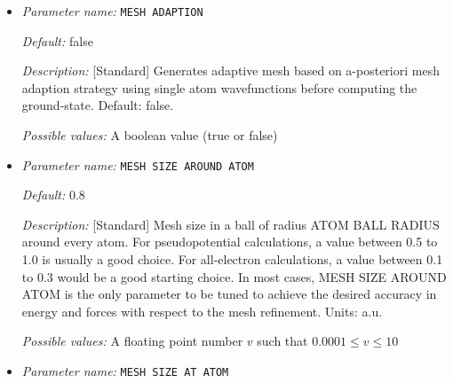 \begin{itemize}
{\it Default:} 5


{\it Description:} [Developer] Number of wavefunctions to be used for error estimation.


{\it Possible values:} An integer $n$ such that $0\leq n \leq 2147483647$
\item {\it Parameter name:} {\tt MESH ADAPTION}
\label{parameters:Finite element mesh parameters/Auto mesh generation parameters/MESH ADAPTION}
\label{parameters:Finite_20element_20mesh_20parameters/Auto_20mesh_20generation_20parameters/MESH_20ADAPTION}




{\it Default:} false


{\it Description:} [Standard] Generates adaptive mesh based on a-posteriori mesh adaption strategy using single atom wavefunctions before computing the ground-state. Default: false.


{\it Possible values:} A boolean value (true or false)
\item {\it Parameter name:} {\tt MESH SIZE AROUND ATOM}
\label{parameters:Finite element mesh parameters/Auto mesh generation parameters/MESH SIZE AROUND ATOM}
\label{parameters:Finite_20element_20mesh_20parameters/Auto_20mesh_20generation_20parameters/MESH_20SIZE_20AROUND_20ATOM}




{\it Default:} 0.8


{\it Description:} [Standard] Mesh size in a ball of radius ATOM BALL RADIUS around every atom. For pseudopotential calculations, a value between 0.5 to 1.0 is usually a good choice. For all-electron calculations, a value between 0.1 to 0.3 would be a good starting choice. In most cases, MESH SIZE AROUND ATOM is the only parameter to be tuned to achieve the desired accuracy in energy and forces with respect to the mesh refinement. Units: a.u.


{\it Possible values:} A floating point number $v$ such that $0.0001 \leq v \leq 10$
\item {\it Parameter name:} {\tt MESH SIZE AT ATOM}
\label{parameters:Finite element mesh parameters/Auto mesh generation parameters/MESH SIZE AT ATOM}
\label{parameters:Finite_20element_20mesh_20parameters/Auto_20mesh_20generation_20parameters/MESH_20SIZE_20AT_20ATOM}



\end{itemize}
